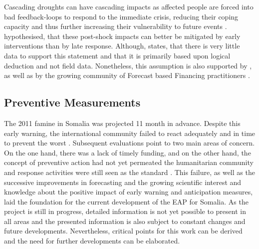 Cascading droughts can have cascading impacts as affected people are forced into bad feedback-loops to respond to the immediate crisis, reducing their coping capacity and thus further increasing their vulnerability to future events \autocite{usaidEconomicsResilienceDrought2018}. \autocite{usaidEconomicsResilienceDrought2018} hypothesised, that these post-shock impacts can better be mitigated by early interventions than by late response. Although, \autocite{usaidEconomicsResilienceDrought2018} states, that there is very little data to support this statement and that it is primarily based upon logical deduction and not field data. Nonetheless, this assumption is also supported by \autocite{aliMitigatingNaturalDisasters2017a}, \autocite{abdulkadirAssessmentDroughtRecurrence2017} as well as by the growing community of Forecast based Financing practitioners \autocite{gualazziniEWEAEarlyWarning2021, harrowsmithFutureForecastImpact2020}.

\subsection{Preventive Measurements}\label{subsec:case_eap}

The 2011 famine in Somalia was projected 11 month in advance. Despite this early warning, the international community failed to react adequately and in time to prevent the worst \autocite{elisabethstephensFORECASTBASEDACTION2015, hillbrunerWhenEarlyWarning2012}. Subsequent evaluations point to two main areas of concern. On the one hand, there was a lack of timely funding, and on the other hand, the concept of preventive action had not yet permeated the humanitarian community and response activities were still seen as the standard \autocite{elisabethstephensFORECASTBASEDACTION2015}. This failure, as well as the successive improvements in forecasting and the growing scientific interest and knowledge about the positive impact of early warning and anticipation measures, laid the foundation for the current development of the EAP for Somalia. As the project is still in progress, detailed information is not yet possible to present in all areas and the presented information is also subject to constant changes and future developments. Nevertheless, critical points for this work can be derived and the need for further developments can be elaborated.

